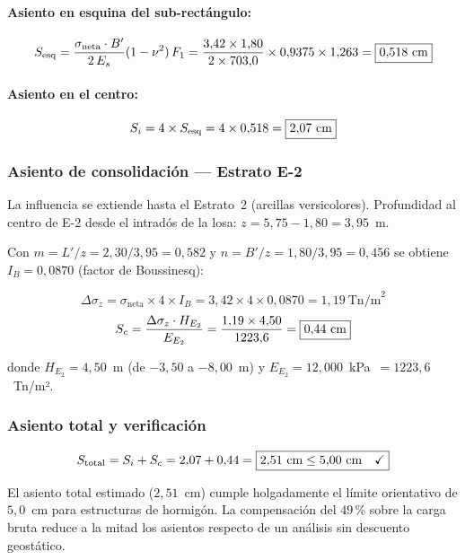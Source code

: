 \paragraph{Asiento en esquina del sub-rectángulo:}
\[
  S_\text{esq} = \frac{\sigma_\text{neta}\cdot B'}{2\,E_s}(1-\nu^2)\,F_1
    = \frac{3{,}42\times1{,}80}{2\times703{,}0}\times0{,}9375\times1{,}263
    = \boxed{0{,}518~\text{cm}}
\]

\paragraph{Asiento en el centro:}
\[
  S_i = 4\times S_\text{esq} = 4\times0{,}518 = \boxed{2{,}07~\text{cm}}
\]

\subsubsection{Asiento de consolidación --- Estrato E-2}

La influencia se extiende hasta el Estrato~2 (arcillas versicolores).
Profundidad al centro de E-2 desde el intradós de la losa:
$z = 5{,}75 - 1{,}80 = 3{,}95$~m.

Con $m=L'/z=2{,}30/3{,}95=0{,}582$ y $n=B'/z=1{,}80/3{,}95=0{,}456$
se obtiene $I_B=0{,}0870$ (factor de Boussinesq):

\[
  \Delta\sigma_z = \sigma_\text{neta}\times4\times I_B
    = 3{,}42\times4\times0{,}0870 = 1{,}19~\text{Tn/m}^2
\]
\[
  S_c = \frac{\Delta\sigma_z\cdot H_{E_2}}{E_{E_2}}
      = \frac{1{,}19\times4{,}50}{1223{,}6} = \boxed{0{,}44~\text{cm}}
\]

donde $H_{E_2}=4{,}50$~m (de $-3{,}50$ a $-8{,}00$~m) y
$E_{E_2}=12{,}000$~kPa~$=1223{,}6$~Tn/m².

\subsubsection{Asiento total y verificación}

\begin{equation}
  S_\text{total} = S_i + S_c = 2{,}07 + 0{,}44
    = \boxed{2{,}51~\text{cm} \leq 5{,}00~\text{cm} \quad \checkmark}
  \label{eq:asiento_total_arqueta}
\end{equation}

\begin{resultadobox}
  El asiento total estimado ($2{,}51$~cm) cumple holgadamente el límite
  orientativo de $5{,}0$~cm para estructuras de hormigón.
  La compensación del $49$\,\% sobre la carga bruta reduce a la mitad los
  asientos respecto de un análisis sin descuento geostático.
\end{resultadobox}

